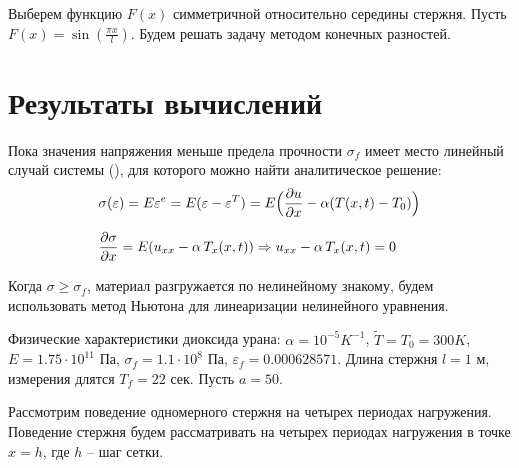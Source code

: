 \documentclass[12pt,a4paper]{article}
\begin{document}
  Выберем функцию $F(x)$ симметричной относительно середины стержня. Пусть $F(x) = \sin(\tfrac{\pi x}{l})$. Будем решать задачу методом конечных разностей.

  \section{Результаты вычислений}

  Пока значения напряжения меньше предела прочности $\sigma_f$ имеет место линейный случай системы (), для которого можно найти аналитическое решение:
  \begin{equation}
    \begin{split}
      &\sigma(\varepsilon) = E\varepsilon^e = E(\varepsilon - \varepsilon^T) = E \Bigl(\dfrac{\partial u}{\partial x} - \alpha(T(x,t) - T_0 ) \Bigr) \\[0.7em]
      &\dfrac{\partial \sigma}{\partial x} = E(u_{xx} - \alpha \, T_x (x, t)) \Rightarrow u_{xx} - \alpha \, T_x (x, t) = 0
    \end{split}
    \label{linearSigma}
  \end{equation}

  Когда $\sigma \geq \sigma_f$, материал разгружается по нелинейному знакому, будем использовать метод Ньютона для линеаризации нелинейного уравнения.

  Физические характеристики диоксида урана: $\alpha = 10^{-5} K^{-1}$, $\widetilde{T} = T_0 = 300 K$, $E = 1.75 \cdot 10^{11}$ Па, $\sigma_f = 1.1 \cdot 10^8$ Па, $\varepsilon_f = 0.000628571$. Длина стержня $l = 1$ м, измерения длятся $T_f = 22$ сек. Пусть $a = 50$.

  Рассмотрим поведение одномерного стержня на четырех периодах нагружения. Поведение стержня будем рассматривать на четырех периодах нагружения в точке $x = h$, где $h$ -- шаг сетки.
\end{document}
